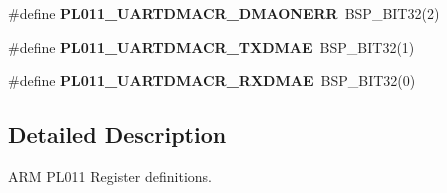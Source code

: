 \begin{DoxyCompactItemize}
\#define {\bfseries P\+L011\+\_\+\+U\+A\+R\+T\+D\+M\+A\+C\+R\+\_\+\+D\+M\+A\+O\+N\+E\+RR}~B\+S\+P\+\_\+\+B\+I\+T32(2)
\item 
\mbox{\label{arm-pl011-regs_8h_a2327f991bfa172adb9c78396e33200f1}} 
\#define {\bfseries P\+L011\+\_\+\+U\+A\+R\+T\+D\+M\+A\+C\+R\+\_\+\+T\+X\+D\+M\+AE}~B\+S\+P\+\_\+\+B\+I\+T32(1)
\item 
\mbox{\label{arm-pl011-regs_8h_ad99432c2c9bb51aa92921dcbd47ef3eb}} 
\#define {\bfseries P\+L011\+\_\+\+U\+A\+R\+T\+D\+M\+A\+C\+R\+\_\+\+R\+X\+D\+M\+AE}~B\+S\+P\+\_\+\+B\+I\+T32(0)
\end{DoxyCompactItemize}


\subsection{Detailed Description}
A\+RM P\+L011 Register definitions. 

